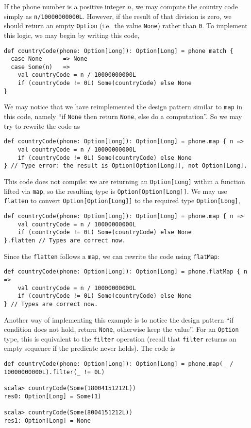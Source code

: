 If the phone number is a positive integer $n$, we may compute the
country code simply as \lstinline!n/10000000000L!. However, if the
result of that division is zero, we should return an empty \lstinline!Option!
(i.e.~the value \lstinline!None!) rather than \lstinline!0!. To
implement this logic, we may begin by writing this code,
\begin{lstlisting}
def countryCode(phone: Option[Long]): Option[Long] = phone match {
  case None      => None
  case Some(n)   =>
    val countryCode = n / 10000000000L
    if (countryCode != 0L) Some(countryCode) else None 
}
\end{lstlisting}
We may notice that we have reimplemented the design pattern similar
to \lstinline!map! in this code, namely \textsf{``}if \lstinline!None! then
return \lstinline!None!, else do a computation\textsf{''}. So we may try
to rewrite the code as
\begin{lstlisting}
def countryCode(phone: Option[Long]): Option[Long] = phone.map { n =>
    val countryCode = n / 10000000000L
    if (countryCode != 0L) Some(countryCode) else None 
} // Type error: the result is Option[Option[Long]], not Option[Long].
\end{lstlisting}
This code does not compile: we are returning an \lstinline!Option[Long]!
within a function lifted via \lstinline!map!, so the resulting type
is \lstinline!Option[Option[Long]]!. We may use \lstinline!flatten!
to convert \lstinline!Option[Option[Long]]! to the required type
\lstinline!Option[Long]!,
\begin{lstlisting}
def countryCode(phone: Option[Long]): Option[Long] = phone.map { n =>
    val countryCode = n / 10000000000L
    if (countryCode != 0L) Some(countryCode) else None 
}.flatten // Types are correct now.
\end{lstlisting}
Since the \lstinline!flatten! follows a \lstinline!map!, we can
rewrite the code using \lstinline!flatMap!:
\begin{lstlisting}
def countryCode(phone: Option[Long]): Option[Long] = phone.flatMap { n =>
    val countryCode = n / 10000000000L
    if (countryCode != 0L) Some(countryCode) else None 
} // Types are correct now.
\end{lstlisting}
Another way of implementing this example is to notice the design pattern
\textsf{``}if condition does not hold, return \lstinline!None!, otherwise
keep the value\textsf{''}. For an \lstinline!Option! type, this is equivalent
to the \lstinline!filter! operation (recall that \lstinline!filter!
returns an empty sequence if the predicate never holds). The code
is
\begin{lstlisting}
def countryCode(phone: Option[Long]): Option[Long] = phone.map(_ / 10000000000L).filter(_ != 0L)

scala> countryCode(Some(18004151212L))
res0: Option[Long] = Some(1)

scala> countryCode(Some(8004151212L))
res1: Option[Long] = None
\end{lstlisting}


